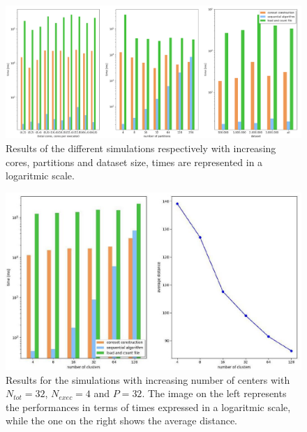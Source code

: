\documentclass[a4paper, 11pt]{article}
\begin{document}
\egroup
\begin{figure}
	\vspace{0pt}
  \centering
      \includegraphics[scale=0.35]{grafici.png}
  \caption{Results of the different simulations respectively with increasing cores, partitions and dataset size, times are represented in a logaritmic scale.}\label{image:a}

\end{figure}

\begin{figure}

  \centering
      \includegraphics[scale=0.35]{result.jpg}
  \caption{Results for the simulations with increasing number of centers with $N_{tot} = 32$, $N_{exec} = 4$ and $P=32$. The image on the left represents the performances in terms of times expressed in a logaritmic scale, while the one on the right shows the average distance.}\label{image:b}
\end{figure}
\end{document}
